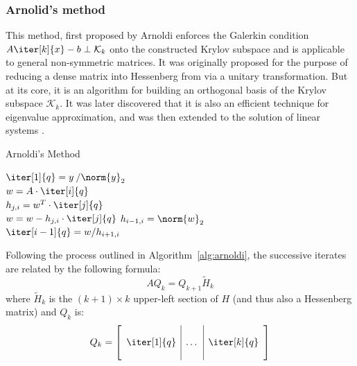 \subsubsection{Arnolid's method}
\label{sec:arnoldi}
This method, first proposed by Arnoldi \cite{arnoldi_principle_1951} enforces the Galerkin condition $A\iter[k]{x} -b \perp \mathcal{K}_k$ onto the constructed Krylov subspace and is applicable to general non-symmetric matrices. It was originally proposed for the purpose of reducing a dense matrix into Hessenberg from via a unitary transformation. But at its core, it is an algorithm for building an orthogonal basis of the Krylov subspace $\mathcal{K}_k$. It was later discovered that it is also an efficient technique for eigenvalue approximation, and was then extended to the solution of linear systems \cite{saad_iterative_2003}. 

\begin{algorithm}[h]
  \caption{Arnoldi's Method}
  \label{alg:arnoldi}
  \SetAlgoLined
  $\iter[1]{q}= y\:/\norm{y}_2$ \\
   {
    $w =A\cdot \iter[i]{q}$ \\
     {
      $h_{j,i} = w^T\cdot \iter[j]{q}$ \\
      $ w = w - h_{j,i}\cdot \iter[j]{q}$}
    $h_{i-1,i} = \norm{w}_2$ \\
    $\iter[i-1]{q} = w/h_{i+1,i}$
  }
\end{algorithm}

\noindent Following the process outlined in Algorithm~\hyperref[alg:arnoldi]{\ref{alg:arnoldi}}, the successive iterates are related by the following formula:
\begin{equation}
\label{eqn:arnoldi}
AQ_k=Q_{k+1}\tilde{H}_k
\end{equation}
\noindent where $\tilde{H}_k$ is the $(k+1) \times k$ upper-left section of $H$ (and thus also a Hessenberg matrix) and $Q_k$ is:
\begin{equation}
  Q_k =
  \left[
    \begin{array}{c|c|c}
      & & \\
      \iter[1]{q} &\dots & \iter[k]{q} \\
      & & \\
    \end{array}
  \right] 
\end{equation}

